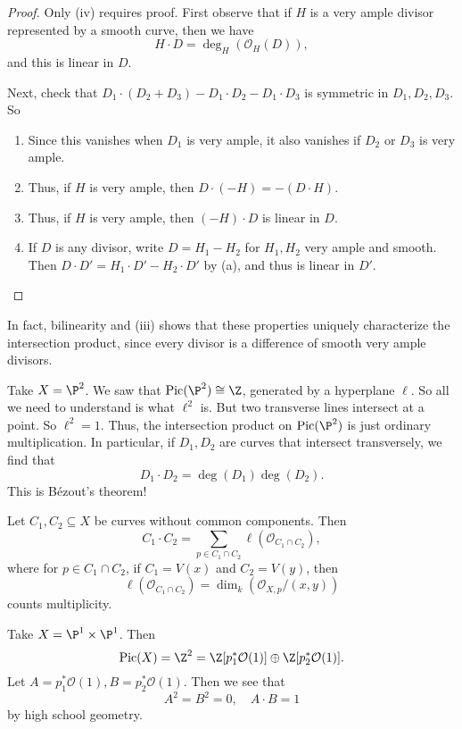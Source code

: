 \documentclass[a4paper]{article}
\newcommand\Pic{\mathrm{Pic}}
\begin{document}
\begin{proof}
  Only (iv) requires proof. First observe that if $H$ is a very ample divisor represented by a smooth curve, then we have
  \[
    H \cdot D = \deg_H(\mathcal{O}_H(D)),
  \]
  and this is linear in $D$.

  Next, check that $D_1 \cdot (D_2 + D_3) - D_1 \cdot D_2 - D_1 \cdot D_3$ is symmetric in $D_1, D_2, D_3$. So
  \begin{enumerate}[label=(\alph*)]
    \item Since this vanishes when $D_1$ is very ample, it also vanishes if $D_2$ or $D_3$ is very ample.
    \item Thus, if $H$ is very ample, then $D \cdot (-H) = - (D \cdot H)$.
    \item Thus, if $H$ is very ample, then $(-H) \cdot D$ is linear in $D$.
    \item If $D$ is any divisor, write $D = H_1 - H_2$ for $H_1, H_2$ very ample and smooth. Then $D \cdot D' = H_1 \cdot D' - H_2 \cdot D'$ by (a), and thus is linear in $D'$.\qedhere
  \end{enumerate}
\end{proof}

In fact, bilinearity and (iii) shows that these properties uniquely characterize the intersection product, since every divisor is a difference of smooth very ample divisors.

\begin{eg}
  Take $X = \P^2$. We saw that $\Pic(\P^2) \cong \Z$, generated by a hyperplane $\ell$. So all we need to understand is what $\ell^2$ is. But two transverse lines intersect at a point. So $\ell^2 = 1$. Thus, the intersection product on $\Pic(\P^2)$ is just ordinary multiplication. In particular, if $D_1, D_2$ are curves that intersect transversely, we find that
  \[
    D_1 \cdot D_2 = \deg(D_1) \deg(D_2).
  \]
  This is B\'ezout's theorem!
\end{eg}
\begin{ex}
  Let $C_1, C_2 \subseteq X$ be curves without common components. Then
  \[
    C_1 \cdot C_2 = \sum_{p \in C_1 \cap C_2} \ell(\mathcal{O}_{C_1 \cap C_2}),
  \]
  where for $p \in C_1 \cap C_2$, if $C_1 = V(x)$ and $C_2 = V(y)$, then
  \[
    \ell(\mathcal{O}_{C_1 \cap C_2}) = \dim_k(\mathcal{O}_{X, p}/(x, y))
  \]
  counts multiplicity.
\end{ex}

\begin{eg}
  Take $X = \P^1 \times \P^1$. Then
  \[
    \Pic(X) = \Z^2 = \Z[p_1^* \mathcal{O}(1)] \oplus \Z[p_2^* \mathcal{O}(1)].
  \]
  Let $A = p_1^* \mathcal{O}(1), B = p_2^* \mathcal{O}(1)$. Then we see that
  \[
    A^2 = B^2 = 0,\quad A \cdot B = 1
  \]
  by high school geometry.
\end{eg}
\end{document}
